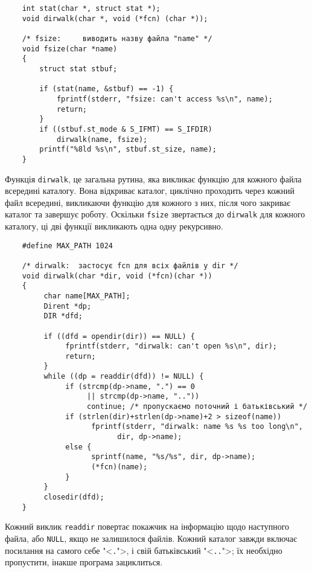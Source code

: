 \documentclass[a4paper,12pt]{book}
\begin{document}
  \begin{verbatim}
    int stat(char *, struct stat *);
    void dirwalk(char *, void (*fcn) (char *));

    /* fsize:     виводить назву файла "name" */
    void fsize(char *name)
    {
        struct stat stbuf;

        if (stat(name, &stbuf) == -1) {
            fprintf(stderr, "fsize: can't access %s\n", name);
            return;
        }
        if ((stbuf.st_mode & S_IFMT) == S_IFDIR)
            dirwalk(name, fsize);
        printf("%8ld %s\n", stbuf.st_size, name);
    }
  \end{verbatim}

  Функція \texttt{dirwalk}, це загальна рутина, яка викликає функцію для кожного файла
  всередині каталогу. Вона відкриває каталог, циклічно проходить через кожний файл
  всередині, викликаючи функцію для кожного з них, після чого закриває каталог та завершує
  роботу. Оскільки \texttt{fsize} звертається до \texttt{dirwalk} для кожного каталогу, ці
  дві функції викликають одна одну рекурсивно.

  \begin{verbatim}
    #define MAX_PATH 1024

    /* dirwalk:  застосує fcn для всіх файлів у dir */
    void dirwalk(char *dir, void (*fcn)(char *))
    {
         char name[MAX_PATH];
         Dirent *dp;
         DIR *dfd;

         if ((dfd = opendir(dir)) == NULL) {
              fprintf(stderr, "dirwalk: can't open %s\n", dir);
              return;
         }
         while ((dp = readdir(dfd)) != NULL) {
              if (strcmp(dp->name, ".") == 0
                   || strcmp(dp->name, ".."))
                   continue; /* пропускаємо поточний і батьківський */
              if (strlen(dir)+strlen(dp->name)+2 > sizeof(name))
                    fprintf(stderr, "dirwalk: name %s %s too long\n",
                          dir, dp->name);
              else {
                    sprintf(name, "%s/%s", dir, dp->name);
                    (*fcn)(name);
              }
         }
         closedir(dfd);
    }
  \end{verbatim}

  Кожний виклик \texttt{readdir} повертає покажчик на інформацію щодо наступного файла,
  або \texttt{NULL}, якщо не залишилося файлів. Кожний каталог завжди включає посилання на
  самого себе "<\texttt{.}">, і свій батьківський "<\texttt{..}">;
  їх необхідно пропустити, інакше програма зациклиться.
\end{document}

